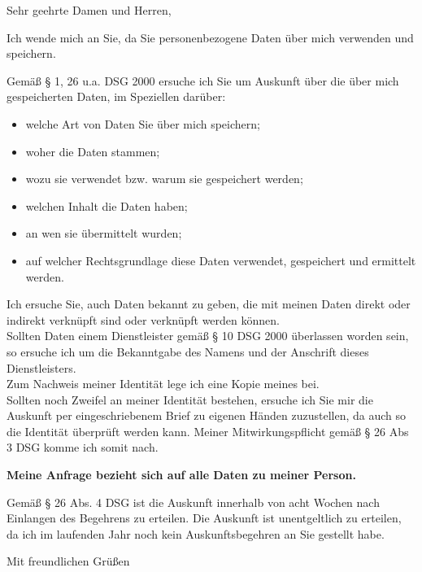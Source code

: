 \documentclass[%
  fontsize=11pt, %
  version=last%
]{scrlttr2}
\begin{document}
\begin{letter}
{
  \ziel
}

\opening{Sehr geehrte Damen und Herren,}
Ich wende mich an Sie, da Sie personenbezogene Daten über mich verwenden und speichern.\par
Gemäß § 1, 26 u.a. DSG 2000 ersuche ich Sie um Auskunft über die über mich gespeicherten Daten, im Speziellen darüber:
\begin{itemize}
  \item welche Art von Daten Sie über mich speichern;
  \item woher die Daten stammen;
  \item wozu sie verwendet bzw. warum sie gespeichert werden;
  \item welchen Inhalt die Daten haben;
  \item an wen sie übermittelt wurden;
  \item auf welcher Rechtsgrundlage diese Daten verwendet, gespeichert und ermittelt werden.
\end{itemize}

Ich ersuche Sie, auch Daten bekannt zu geben, die mit meinen Daten direkt oder indirekt verknüpft sind oder verknüpft werden können.\\
Sollten Daten einem Dienstleister gemäß § 10 DSG 2000 überlassen worden sein, so ersuche ich um die Bekanntgabe des Namens und der Anschrift dieses Dienstleisters.\\
Zum Nachweis meiner Identität lege ich eine Kopie meines \ausweis bei.\\
Sollten noch Zweifel an meiner Identität bestehen, ersuche ich Sie mir die Auskunft per eingeschriebenem Brief zu eigenen Händen zuzustellen, da auch so die Identität überprüft werden kann. Meiner Mitwirkungspflicht gemäß § 26 Abs 3 DSG komme ich somit nach.\par

\textbf{Meine Anfrage bezieht sich auf alle Daten zu meiner Person.}\par

Gemäß § 26 Abs. 4 DSG ist die Auskunft innerhalb von acht Wochen nach Einlangen des Begehrens zu erteilen. Die Auskunft ist unentgeltlich zu erteilen, da ich im laufenden Jahr noch kein Auskunftsbegehren an Sie gestellt habe.

\closing{Mit freundlichen Grüßen}


\end{letter}
\end{document}
